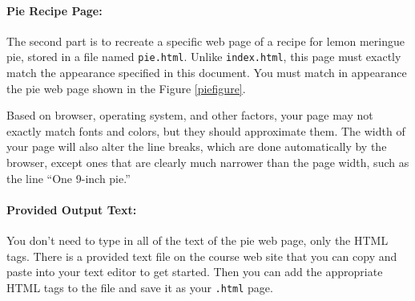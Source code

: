\documentclass{article}
\begin{document}
\paragraph{Pie Recipe Page:} The second part is to recreate a specific web
  page of a recipe for lemon meringue pie, stored in a file named
  \verb|pie.html|. Unlike \verb|index.html|, this page must exactly
  match the appearance specified in this document.  You must match in
  appearance the pie web page shown in the Figure \ref{piefigure}.

  Based on browser, operating system, and other factors, your page may
  not exactly match fonts and colors, but they should approximate them. The
  width of your page will also alter the line breaks, which are
  done automatically by the browser, except ones that are clearly
  much narrower than the page width, such as the line ``One 9-inch
  pie.''


\paragraph{Provided Output Text:} You don't need to type in all of the text
  of the pie web page, only the HTML tags. There is a provided text
  file on the course web site that you can copy and paste into your
  text editor to get started. Then you can add the appropriate HTML
  tags to the file and save it as your \verb|.html| page.
\end{document}
